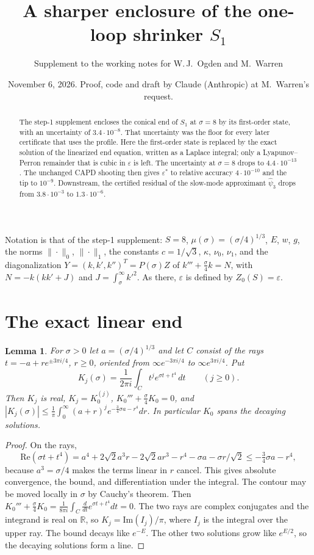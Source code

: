 \documentclass[11pt]{amsart}
\title{A sharper enclosure of the one-loop shrinker $S_1$}
\author{Supplement to the working notes for W.\,J.~Ogden and M.~Warren}
\date{November 6, 2026. Proof, code and draft by Claude (Anthropic) at M.~Warren's request.}
\newtheorem{lemma}[theorem]{Lemma}
\theoremstyle{remark}
\newcommand{\R}{\mathbb{R}}
\newcommand{\eps}{\varepsilon}
\begin{document}
\begin{abstract}
The step-1 supplement encloses the conical end of $S_1$ at $\sigma=8$ by its first-order state, with an uncertainty of $3.4\cdot10^{-8}$. That uncertainty was the floor for every later certificate that uses the profile. Here the first-order state is replaced by the exact solution of the linearized end equation, written as a Laplace integral; only a Lyapunov--Perron remainder that is cubic in $\eps$ is left. The uncertainty at $\sigma=8$ drops to $4.4\cdot10^{-13}$. The unchanged CAPD shooting then gives $\eps^*$ to relative accuracy $4\cdot10^{-10}$ and the tip to $10^{-9}$. Downstream, the certified residual of the slow-mode approximant $\hat\psi_3$ drops from $3.8\cdot10^{-3}$ to $1.3\cdot10^{-6}$.
\end{abstract}
\maketitle



Notation is that of the step-1 supplement: $S=8$, $\mu(\sigma)=(\sigma/4)^{1/3}$, $E$, $w$, $g$, the norms $\|\cdot\|_0$, $\|\cdot\|_1$, the constants $c=1/\sqrt3$, $\kappa$, $\nu_0$, $\nu_1$, and the diagonalization $Y=(k,k',k'')^T=P(\sigma)Z$ of $k'''+\frac\sigma4k=N$, with $N=-k(kk'+J)$ and $J=\int_\sigma^\infty k'^2$. As there, $\eps$ is defined by $Z_0(S)=\eps$.

\section{The exact linear end}
\begin{lemma}\label{lem:laplace}
For $\sigma>0$ let $a=(\sigma/4)^{1/3}$ and let $C$ consist of the rays $t=-a+re^{\pm3\pi i/4}$, $r\ge0$, oriented from $\infty e^{-3\pi i/4}$ to $\infty e^{3\pi i/4}$. Put
\[
K_j(\sigma)=\frac1{2\pi i}\int_C t^j e^{\sigma t+t^4}\,dt\qquad(j\ge0).
\]
Then $K_j$ is real, $K_j=K_0^{(j)}$, $K_0'''+\frac\sigma4K_0=0$, and $|K_j(\sigma)|\le\frac1\pi\int_0^\infty(a+r)^je^{-\frac34\sigma a-r^4}dr$. In particular $K_0$ spans the decaying solutions.
\end{lemma}

\begin{proof}
On the rays,
\[
\mathrm{Re}(\sigma t+t^4)=a^4+2\sqrt2a^3r-2\sqrt2ar^3-r^4-\sigma a-\sigma r/\sqrt2\le-\tfrac34\sigma a-r^4,
\]
because $a^3=\sigma/4$ makes the terms linear in $r$ cancel. This gives absolute convergence, the bound, and differentiation under the integral. The contour may be moved locally in $\sigma$ by Cauchy's theorem. Then $K_0'''+\frac\sigma4K_0=\frac1{8\pi i}\int_C\frac d{dt}e^{\sigma t+t^4}dt=0$. The two rays are complex conjugates and the integrand is real on $\R$, so $K_j=\mathrm{Im}(I_j)/\pi$, where $I_j$ is the integral over the upper ray. The bound decays like $e^{-E}$. The other two solutions grow like $e^{E/2}$, so the decaying solutions form a line.
\end{proof}
\end{document}
